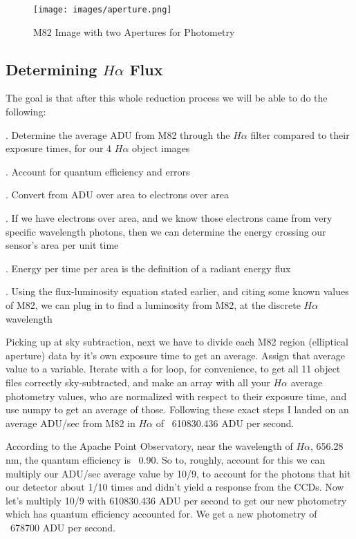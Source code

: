 \documentclass[modern]{aastex63}
\begin{document}
\begin{figure}
\centering
\texttt{[image: images/aperture.png]}
\caption{\label{fig:frog}M82 Image with two Apertures for Photometry}
\end{figure}

\subsection{Determining $H\alpha$ Flux}

The goal is that after this whole reduction process we will be able to do the following:

    . Determine the average ADU from M82 through the $H\alpha$ filter compared to their exposure times, for our 4 $H\alpha$ object images
    
    . Account for quantum efficiency and errors
    
    . Convert from ADU over area to electrons over area
    
    . If we have electrons over area, and we know those electrons came from very specific wavelength photons, then we can determine the energy crossing our sensor's area per unit time
    
    . Energy per time per area is the definition of a radiant energy flux
    
    . Using the flux-luminosity equation stated earlier, and citing some known values of M82, we can plug in to find a luminosity from M82, at the discrete $H\alpha$ wavelength

Picking up at sky subtraction, next we have to divide each M82 region (elliptical aperture) data by it's own exposure time to get an average. Assign that average value to a variable. Iterate with a for loop, for convenience, to get all 11 object files correctly sky-subtracted, and make an array with all your $H\alpha$ average photometry values, who are normalized with respect to their exposure time, and use numpy to get an average of those. Following these exact steps I landed on an average ADU/sec from M82 in $H\alpha$ of ~610830.436 ADU per second. 

According to the Apache Point Observatory, near the wavelength of $H\alpha$, 656.28 nm, the quantum efficiency is ~0.90. So to, roughly, account for this we can multiply our ADU/sec average value by 10/9, to account for the photons that hit our detector about 1/10 times and didn't yield a response from the CCDs. Now let's multiply 10/9 with 610830.436 ADU per second to get our new photometry which has quantum efficiency accounted for. We get a new photometry of ~678700 ADU per second. 
\end{document}
